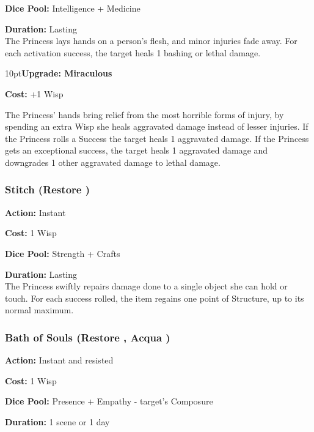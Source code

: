 \noindent \textbf{Dice Pool:} Intelligence  + Medicine

\noindent \textbf{Duration:} Lasting \\

\noindent The Princess lays hands on a person's flesh, and minor injuries fade away. For each activation success, the target heals 1 bashing or lethal damage.

\begin{myindentpar}{10pt}\textbf{Upgrade: Miraculous}

\noindent \textbf{Cost:} +1 Wisp

The Princess' hands bring relief from the most horrible forms of injury, by spending an extra Wisp she heals aggravated damage instead of lesser injuries. If the Princess rolls a Success the target heals 1 aggravated damage. If the Princess gets an exceptional success, the target heals 1 aggravated damage and downgrades 1 other aggravated damage to lethal damage.\end{myindentpar}

\subsubsection*{Stitch (Restore \textbullet\textbullet)}

\noindent \textbf{Action:} Instant

\noindent \textbf{Cost:} 1 Wisp

\noindent \textbf{Dice Pool:} Strength + Crafts

\noindent \textbf{Duration:} Lasting \\

\noindent The Princess swiftly repairs damage done to a single object she can hold or touch. For each success rolled, the item regains one point of Structure, up to its normal maximum.

\subsubsection*{Bath of Souls (Restore \textbullet\textbullet, Acqua \textbullet)}

\noindent \textbf{Action:} Instant and resisted

\noindent \textbf{Cost:} 1 Wisp

\noindent \textbf{Dice Pool:} Presence + Empathy - target's Composure

\noindent \textbf{Duration:} 1 scene or 1 day \\

